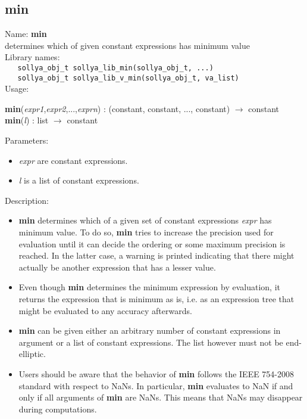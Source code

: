 \subsection{min}
\label{labmin}
\noindent Name: \textbf{min}\\
\phantom{aaa}determines which of given constant expressions has minimum value\\[0.2cm]
\noindent Library names:\\
\verb|   sollya_obj_t sollya_lib_min(sollya_obj_t, ...)|\\
\verb|   sollya_obj_t sollya_lib_v_min(sollya_obj_t, va_list)|\\[0.2cm]
\noindent Usage: 
\begin{center}
\textbf{min}(\emph{expr1},\emph{expr2},...,\emph{exprn}) : (\textsf{constant}, \textsf{constant}, ..., \textsf{constant}) $\rightarrow$ \textsf{constant}\\
\textbf{min}(\emph{l}) : \textsf{list} $\rightarrow$ \textsf{constant}\\
\end{center}
Parameters: 
\begin{itemize}
\item \emph{expr} are constant expressions.
\item \emph{l} is a list of constant expressions.
\end{itemize}
\noindent Description: \begin{itemize}

\item \textbf{min} determines which of a given set of constant expressions
   \emph{expr} has minimum value. To do so, \textbf{min} tries to increase the
   precision used for evaluation until it can decide the ordering or some
   maximum precision is reached. In the latter case, a warning is printed
   indicating that there might actually be another expression that has a
   lesser value.

\item Even though \textbf{min} determines the minimum expression by evaluation, it 
   returns the expression that is minimum as is, i.e. as an expression
   tree that might be evaluated to any accuracy afterwards.

\item \textbf{min} can be given either an arbitrary number of constant
   expressions in argument or a list of constant expressions. The list
   however must not be end-elliptic.

\item Users should be aware that the behavior of \textbf{min} follows the IEEE
   754-2008 standard with respect to NaNs. In particular, \textbf{min}
   evaluates to NaN if and only if all arguments of \textbf{min} are
   NaNs. This means that NaNs may disappear during computations.
\end{itemize}
